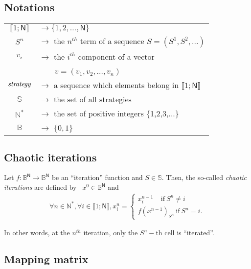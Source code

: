 \documentclass[conference]{IEEEtran}
\begin{document}
\subsection{Notations}
\begin{tabular}{@{}c@{}@{}l@{}}
$\llbracket 1;\mathsf{N} \rrbracket$ & $\rightarrow\{1,2,\hdots,\mathsf{N}\}$ \\
$S^{n}$ & $\rightarrow$ the $n^{th}$ term of a sequence $S=(S^{1},S^{2},\hdots)$ \\
$v_{i}$ & $\rightarrow$ the $i^{th}$ component of a vector\\
&~~~~$v=(v_{1},v_{2},\hdots, v_n)$\\
$\emph{strategy}$ & $\rightarrow$ a sequence which elements belong in $\llbracket 1;\mathsf{N} \rrbracket $ \\
$\mathbb{S}$ & $\rightarrow$ the set of all strategies \\
$\mathds{N}^{\ast }$ & $\rightarrow$ the set of positive integers \{1,2,3,...\} \\
$\mathds{B}$ & $\rightarrow$  $\{0,1\}$ \\
\end{tabular}




\subsection{Chaotic iterations}
\label{subsection:Chaotic iterations}

\begin{definition}
Let $f:\mathds{B}^{\mathsf{N}}\longrightarrow \mathds{B}^{\mathsf{N}}$ be an ``iteration'' function and $S\in \mathbb{S}
$. Then, the so-called \emph{chaotic iterations} are defined by~\cite{Robert1986} $x^0\in \mathds{B}^{\mathsf{N}}$ and
$$
\begin{array}{l}
\forall n\in \mathds{N}^{\ast },\forall i\in \llbracket1;\mathsf{N}\rrbracket ,x_i^n=\left\{
\begin{array}{l}
x_i^{n-1}~~~~~\text{if}~S^n\neq i \\
f(x^{n-1})_{S^n}~\text{if}~S^n=i.\end{array} \right. \end{array}
$$
\end{definition}
In other words, at the $n^{th}$ iteration, only the $S^{n}-$th cell is
\textquotedblleft iterated\textquotedblright.



\subsection{Mapping matrix}
\end{document}
